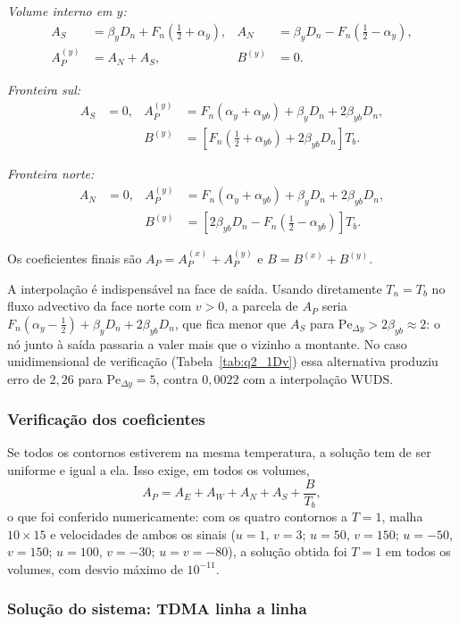 \emph{Volume interno em $y$:}
\begin{align*}
  A_S&=\beta_yD_n+F_n\left(\tfrac12+\alpha_y\right), &
  A_N&=\beta_yD_n-F_n\left(\tfrac12-\alpha_y\right),\\
  A_P^{(y)}&=A_N+A_S, & B^{(y)}&=0 .
\end{align*}

\emph{Fronteira sul:}
\begin{align*}
  A_S&=0, & A_P^{(y)}&=F_n\left(\alpha_y+\alpha_{yb}\right)+\beta_yD_n+2\beta_{yb}D_n,\\
  & & B^{(y)}&=\left[F_n\left(\tfrac12+\alpha_{yb}\right)+2\beta_{yb}D_n\right]T_b .
\end{align*}

\emph{Fronteira norte:}
\begin{align*}
  A_N&=0, & A_P^{(y)}&=F_n\left(\alpha_y+\alpha_{yb}\right)+\beta_yD_n+2\beta_{yb}D_n,\\
  & & B^{(y)}&=\left[2\beta_{yb}D_n-F_n\left(\tfrac12-\alpha_{yb}\right)\right]T_b .
\end{align*}

Os coeficientes finais são $A_P=A_P^{(x)}+A_P^{(y)}$ e $B=B^{(x)}+B^{(y)}$.

A interpolação é indispensável na face de saída. Usando diretamente $T_n=T_b$
no fluxo advectivo da face norte com $v>0$, a parcela de $A_P$ seria
$F_n(\alpha_y-\tfrac12)+\beta_yD_n+2\beta_{yb}D_n$, que fica menor que $A_S$
para $\mathrm{Pe}_{\Delta y}>2\beta_{yb}\approx2$: o nó junto à saída passaria
a valer mais que o vizinho a montante. No caso unidimensional de verificação
(Tabela~\ref{tab:q2_1Dv}) essa alternativa produziu erro de $2{,}26$ para
$\mathrm{Pe}_{\Delta y}=5$, contra $0{,}0022$ com a interpolação WUDS.

\subsubsection*{Verificação dos coeficientes}

Se todos os contornos estiverem na mesma temperatura, a solução tem de ser
uniforme e igual a ela. Isso exige, em todos os volumes,
\[
  A_P=A_E+A_W+A_N+A_S+\frac{B}{T_b},
\]
o que foi conferido numericamente: com os quatro contornos a $T=1$, malha
$10\times15$ e velocidades de ambos os sinais ($u=1$, $v=3$; $u=50$,
$v=150$; $u=-50$, $v=150$; $u=100$, $v=-30$; $u=v=-80$), a solução obtida
foi $T=1$ em todos os volumes, com desvio máximo de $10^{-11}$.

\subsubsection*{Solução do sistema: TDMA linha a linha}

